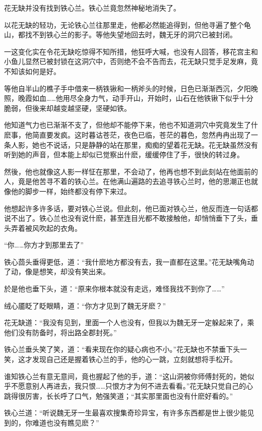 \documentclass[12pt,oneside]{book}
\begin{document}
花无缺并没有找到铁心兰。铁心兰竟忽然神秘地消失了。

以花无缺的轻功，无论铁心兰往那里走，他都必然能追得到，但他寻遍了整个龟山，都找不到铁心兰的影子。等他失望地回去时，魏无牙的洞穴已被封闭。

一这变化实在令花无缺吃惊得不知所措，他狂呼大喊，也没有人回答，移花宫主和小鱼儿显然已被封锁在这洞穴中，否则绝不会不告而去，花无缺只觉手足发麻，竟不知该如何是好。

等他自半山的樵子手中借来一柄铁锹和一柄斧头的时候，日色已渐渐西沉，夕阳晚照，晚霞如血\ldots\ldots 他用尽全身力气，动手开山，开始时，山石在他铁锹下似乎十分脆弱，但後来却越变越坚硬，坚硬如铁。

他知道气力也已渐渐不支了，但他却不能停下来，他也不知道洞穴中究竟发生了什麽事，他简直要发疯。这时暮诂苍茫，夜色已临，苍茫的暮色，忽然冉冉出现了一条人影，她也不说话，只是静静的站在那里，痴痴的望着花无缺。花无缺虽然没有听到她的声音，但本能上却似已觉察出什麽，缓缓停住了手，很快的转过身。

然後，他也就像这人影一样怔在那里，不会动了，他再也想不到此刻站在他面前的人，竟是他苦寻不着的铁心兰。在他满山遍路的去追寻铁心兰时，他的思潮正也就像他的脚步一样，始终都没有停下来过。

他想起许多许多话，要对铁心兰说。但此刻，他已面对铁心兰，他反而连一句话都说不出了。铁心兰也没有说什麽，甚至连目光都不敢接触他，却悄悄垂下了头，垂头弄着被风吹起的衣角。

``你\ldots\ldots 你方才到那里去了''

铁心茴头垂得更低，道：``我什麽地方都没有去，我一直都在这里。''花无缺嘴角动了动，像是想笑，却没有笑出来。

於是他也垂下头，道：``原来你根本就没有走远，难怪我找不到你了\ldots\ldots{}''

绒心靥眨了眨眼睛，道：``你方才见到了魏无牙麽？''

花无缺道：``我没有见到，里面一个人也没有，但我以为魏无牙一定躲起来了，乘他们没有防备时，将出路全郡封死。''

铁心兰垂头笑了笑，道：``看来现在你的疑心病也不小。''花无缺也不禁垂下头一笑，这才发现自己还是握着铁心兰的手，他的心一跳，立刻就想将手松开。

谁知铁心兰有意无意间，竟也握起了他的手，道：``这山洞被你师傅封死的，她似乎不愿意别人再进去，我只恨\ldots\ldots 只恨方才为何不进去看看。''花无缺只觉自己的心跳得很厉害，长长呼了口气，勉强笑道；``其实那里面也没有什麽好看的。''

铁心兰道：``听说魏无牙一生最喜欢搜集奇珍异宝，有许多东西都是世上很少能见到的，你难道也没有瞧见麽？''
\end{document}
